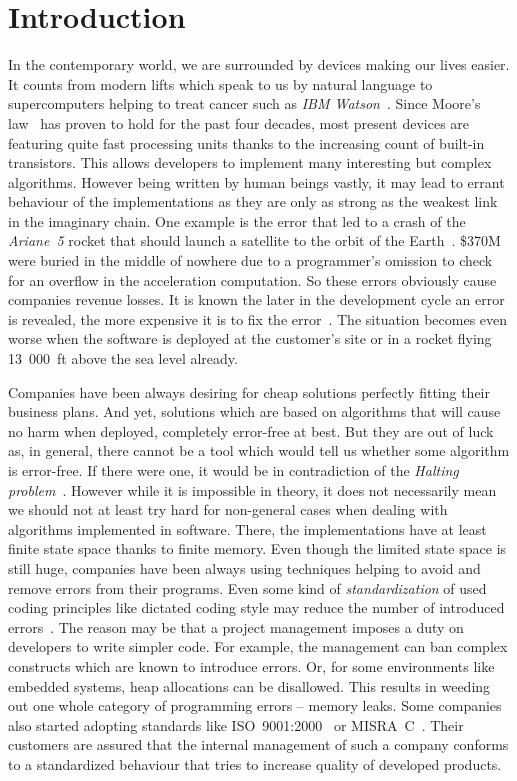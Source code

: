 
\chapter{Introduction}\label{sec:intro}
In the contemporary world, we are surrounded by devices making our lives
easier. It counts from modern lifts which speak to us by natural language to
supercomputers helping to treat cancer such as \emph{IBM
Watson}~\cite{watson-cancer}. Since Moore's law~\cite{moore_law} has proven to
hold for the past four decades, most present devices are featuring quite fast
processing units thanks to the increasing count of built-in transistors. This
allows developers to implement many interesting but complex algorithms.
However being written by human beings vastly, it may lead to errant behaviour
of the implementations as they are only as strong as the weakest link in the
imaginary chain. One example is the error that led to a crash of the
\emph{Ariane~5} rocket that should launch a satellite to the orbit of the
Earth~\cite{ariane_5}. \$370M were buried in the middle of nowhere due to a
programmer's omission to check for an overflow in the acceleration
computation.  So these errors obviously cause companies revenue losses. It is
known the later in the development cycle an error is revealed, the more
expensive it is to fix the error~\cite{topten}. The situation becomes even
worse when the software is deployed at the customer's site or in a rocket
flying 13~000~ft above the sea level already.

Companies have been always desiring for cheap solutions perfectly fitting
their business plans. And yet, solutions which are based on algorithms that
will cause no harm when deployed, completely error-free at best.  But they are
out of luck as, in general, there cannot be a tool which would tell us whether
some algorithm is error-free. If there were one, it would be in contradiction
of the \emph{Halting problem}~\cite{halting_problem}.  However while it is
impossible in theory, it does not necessarily mean we should not at least try
hard for non-general cases when dealing with algorithms implemented in
software. There, the implementations have at least finite state space thanks
to finite memory.  Even though the limited state space is still huge,
companies have been always using techniques helping to avoid and remove errors
from their programs.  Even some kind of \emph{standardization} of used coding
principles like dictated coding style may reduce the number of introduced
errors~\cite{topten}. The reason may be that a project management imposes a
duty on developers to write simpler code. For example, the management can ban
complex constructs which are known to introduce errors. Or, for some
environments like embedded systems, heap allocations can be disallowed. This
results in weeding out one whole category of programming errors -- memory
leaks. Some companies also started adopting standards like
ISO~9001:2000~\cite{iso9000} or MISRA~C~\cite{misra_c}. Their customers are
assured that the internal management of such a company conforms to a
standardized behaviour that tries to increase quality of developed products.

